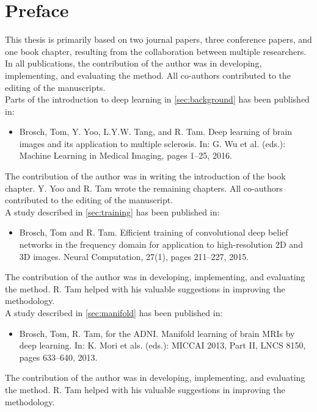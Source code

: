 \chapter*{Preface}

This thesis is primarily based on two journal papers, three conference
papers, and one book chapter, resulting from the collaboration between multiple
researchers. In all publications, the contribution of the author was in
developing, implementing, and evaluating the method. All co-authors
contributed to the editing of the manuscripts.
\\[1em]
Parts of the introduction to deep learning in \ref{sec:background} has been
published in:
\begin{itemize}
\item Brosch, Tom, Y. Yoo, L.Y.W. Tang, and R. Tam.
Deep learning of brain images and its application to multiple sclerosis.
In: G. Wu et al. (eds.): Machine Learning in Medical Imaging, pages 1--25,
2016.
\end{itemize}
The contribution of the author was in writing the introduction of the book
chapter. Y. Yoo and R. Tam wrote the remaining chapters. All co-authors
contributed to the editing of the manuscript.
\\[1em]
A study described in \ref{sec:training} has been published in:
\begin{itemize}
\item Brosch, Tom and R. Tam. Efficient training of convolutional deep
belief networks in the frequency domain for application to high-resolution 2D
and 3D images. Neural Computation, 27(1), pages 211--227, 2015.
\end{itemize}
The contribution of the author was in developing, implementing, and evaluating
the method. R. Tam helped with his valuable suggestions in improving the
methodology.
\\[1em]
A study described in \ref{sec:manifold} has been published in:
\begin{itemize}
\item Brosch, Tom, R. Tam, for the ADNI. Manifold learning of brain MRIs
by deep learning. In: K. Mori et als. (eds.): MICCAI 2013, Part II, LNCS 8150,
pages 633--640, 2013.
\end{itemize}
The contribution of the author was in developing, implementing, and evaluating
the method. R. Tam helped with his valuable suggestions in improving the
methodology.
\\[1em]
